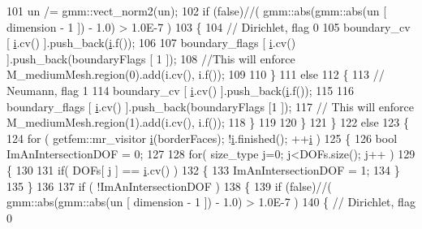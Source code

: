 \begin{DoxyCode}
101                 un /= gmm::vect\_norm2(un);
102                 \textcolor{keywordflow}{if} (\textcolor{keyword}{false})\textcolor{comment}{//( gmm::abs(gmm::abs(un [ dimension - 1 ]) - 1.0) > 1.0E-7 )}
103                 \{
104                     \textcolor{comment}{// Dirichlet, flag 0}
105                     boundary\_cv [ \hyperlink{matrici_8m_a6f6ccfcf58b31cb6412107d9d5281426}{i}.cv() ].push\_back(\hyperlink{matrici_8m_a6f6ccfcf58b31cb6412107d9d5281426}{i}.f());
106                 
107                     boundary\_flags [ \hyperlink{matrici_8m_a6f6ccfcf58b31cb6412107d9d5281426}{i}.cv() ].push\_back(boundaryFlags [ 1 ]);
108                     \textcolor{comment}{//This        will enforce M\_mediumMesh.region(0).add(i.cv(), i.f());}
109                 
110                 \}
111                 \textcolor{keywordflow}{else}
112                 \{
113                     \textcolor{comment}{// Neumann, flag 1}
114                     boundary\_cv [ \hyperlink{matrici_8m_a6f6ccfcf58b31cb6412107d9d5281426}{i}.cv() ].push\_back(\hyperlink{matrici_8m_a6f6ccfcf58b31cb6412107d9d5281426}{i}.f());
115                 
116                     boundary\_flags [ \hyperlink{matrici_8m_a6f6ccfcf58b31cb6412107d9d5281426}{i}.cv() ].push\_back(boundaryFlags [1 ]);
117                     \textcolor{comment}{// This will enforce M\_mediumMesh.region(1).add(i.cv(), i.f());     }
118                 \}
119 
120             \}
121         \}
122         \textcolor{keywordflow}{else}
123         \{
124             \textcolor{keywordflow}{for} ( getfem::mr\_visitor \hyperlink{matrici_8m_a6f6ccfcf58b31cb6412107d9d5281426}{i}(borderFaces); !\hyperlink{matrici_8m_a6f6ccfcf58b31cb6412107d9d5281426}{i}.finished(); ++\hyperlink{matrici_8m_a6f6ccfcf58b31cb6412107d9d5281426}{i} )
125             \{
126                 \textcolor{keywordtype}{bool} ImAnIntersectionDOF = 0;
127                 
128                 \textcolor{keywordflow}{for}( size\_type j=0; j<DOFs.size(); j++ )
129                 \{
130                     
131                     \textcolor{keywordflow}{if}( DOFs[ j ] == \hyperlink{matrici_8m_a6f6ccfcf58b31cb6412107d9d5281426}{i}.cv() )
132                     \{
133                         ImAnIntersectionDOF = 1;
134                     \}
135                 \}
136                 
137                 \textcolor{keywordflow}{if} ( !ImAnIntersectionDOF )
138                 \{
139                         \textcolor{keywordflow}{if} (\textcolor{keyword}{false})\textcolor{comment}{//( gmm::abs(gmm::abs(un [ dimension - 1 ]) - 1.0) > 1.0E-7 )}
140                         \{               \textcolor{comment}{// Dirichlet, flag 0}

\end{DoxyCode}

